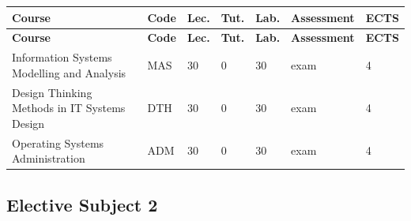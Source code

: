 \documentclass[12pt,a4paper]{article}
\newcommand{\thdrule}{\noalign{\global\setlength{\extrarowheight}{0pt}}}
\newcommand{\thdend}{\noalign{\global\setlength{\extrarowheight}{4pt}}}
\begin{document}
{\scriptsize
\begin{longtable}{m{5.5cm}m{0.8cm}m{1cm}m{1cm}m{1cm}m{1.7cm}m{0.7cm}}
\thdrule\toprule
\rowcolor{pjatkRed}
{\color{white}\footnotesize\textbf{\vphantom{Ag}Course}} & {\color{white}\footnotesize\textbf{\vphantom{Ag}Code}} & {\color{white}\footnotesize\textbf{\vphantom{Ag}Lec.}} & {\color{white}\footnotesize\textbf{\vphantom{Ag}Tut.}} & {\color{white}\footnotesize\textbf{\vphantom{Ag}Lab.}} & {\color{white}\footnotesize\textbf{\vphantom{Ag}Assessment}} & {\color{white}\footnotesize\textbf{\vphantom{Ag}ECTS}} \\
\midrule\thdend
\endfirsthead
\thdrule\toprule
\rowcolor{pjatkRed}
{\color{white}\footnotesize\textbf{\vphantom{Ag}Course}} & {\color{white}\footnotesize\textbf{\vphantom{Ag}Code}} & {\color{white}\footnotesize\textbf{\vphantom{Ag}Lec.}} & {\color{white}\footnotesize\textbf{\vphantom{Ag}Tut.}} & {\color{white}\footnotesize\textbf{\vphantom{Ag}Lab.}} & {\color{white}\footnotesize\textbf{\vphantom{Ag}Assessment}} & {\color{white}\footnotesize\textbf{\vphantom{Ag}ECTS}} \\
\midrule\thdend
\endhead
\rowcolor{tableRowLight} Information Systems Modelling and Analysis & MAS & 30 & 0 & 30 & {\scriptsize exam} & 4 \\
\rowcolor{tableRowAlt} Design Thinking Methods in IT Systems Design & DTH & 30 & 0 & 30 & {\scriptsize exam} & 4 \\
\rowcolor{tableRowLight} Operating Systems Administration & ADM & 30 & 0 & 30 & {\scriptsize exam} & 4 \\
\bottomrule
\end{longtable}}

\subsection*{Elective Subject 2}
\end{document}
